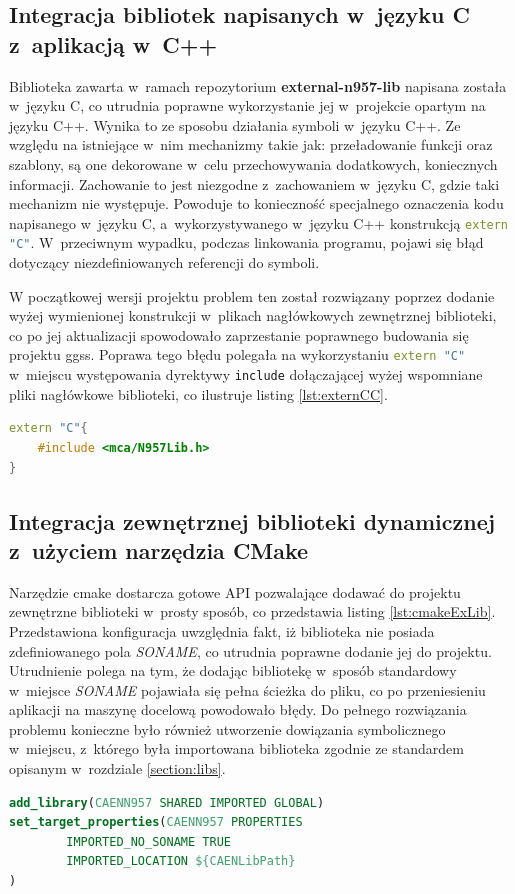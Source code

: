\subsection{Integracja bibliotek napisanych w~języku C z~aplikacją w~C++}
Biblioteka zawarta w~ramach repozytorium \textbf{external-n957-lib} napisana została w~języku C, co utrudnia poprawne wykorzystanie jej w~projekcie opartym na języku C++. Wynika to ze sposobu działania symboli w~języku C++. Ze względu na istniejące w~nim mechanizmy takie jak: przeładowanie funkcji oraz szablony, są one dekorowane w~celu przechowywania dodatkowych, koniecznych informacji. Zachowanie to jest niezgodne z~zachowaniem w~języku C, gdzie taki mechanizm nie występuje. Powoduje to konieczność specjalnego oznaczenia kodu napisanego w~języku C, a~wykorzystywanego w~języku C++ konstrukcją \lstinline[language=c++]{extern "C"}. W~przeciwnym wypadku, podczas linkowania programu, pojawi się błąd dotyczący niezdefiniowanych referencji do symboli.

W początkowej wersji projektu problem ten został rozwiązany poprzez dodanie wyżej wymienionej konstrukcji w~plikach nagłówkowych zewnętrznej biblioteki, co po jej aktualizacji spowodowało zaprzestanie poprawnego budowania się projektu \gls*{ggss}. Poprawa tego błędu polegała na wykorzystaniu \lstinline[language=c++]{extern "C"} w~miejscu występowania dyrektywy \lstinline{include} dołączającej wyżej wspomniane pliki nagłówkowe biblioteki, co ilustruje listing \ref{lst:externCC}.

\begin{lstlisting}[language=c++, caption={Wykorzystanie konstrukcji \lstinline{extern "C"} w~celu integracji biblioteki napisanej w~języku C z~komponentem \textbf{mca-lib}}, label={lst:externCC}]
extern "C"{ 
    #include <mca/N957Lib.h>
}
\end{lstlisting}

\newpage

\subsection{Integracja zewnętrznej biblioteki dynamicznej z~użyciem narzędzia CMake}
Narzędzie \gls*{cmake} dostarcza gotowe API pozwalające dodawać do projektu zewnętrzne biblioteki w~prosty sposób, co przedstawia listing \ref{lst:cmakeExLib}. Przedstawiona konfiguracja uwzględnia fakt, iż biblioteka nie posiada zdefiniowanego pola \textit{SONAME}, co utrudnia poprawne dodanie jej do projektu. Utrudnienie polega na tym, że dodając bibliotekę w~sposób standardowy w~miejsce \textit{SONAME} pojawiała się pełna ścieżka do pliku, co po przeniesieniu aplikacji na maszynę docelową powodowało błędy. Do pełnego rozwiązania problemu konieczne było również utworzenie dowiązania symbolicznego w~miejscu, z~którego była importowana biblioteka zgodnie ze standardem opisanym w~rozdziale \ref{section:libs}.

\begin{lstlisting}[language=cmake, caption={Dodanie zewnętrznej biblioteki do projektu za pomocą narzędzia \gls*{cmake}}, label={lst:cmakeExLib}]
add_library(CAENN957 SHARED IMPORTED GLOBAL)
set_target_properties(CAENN957 PROPERTIES
        IMPORTED_NO_SONAME TRUE
        IMPORTED_LOCATION ${CAENLibPath}
)
\end{lstlisting}
